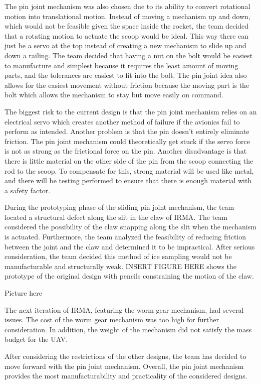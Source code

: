 		The pin joint mechanism was also chosen due to its ability to convert rotational motion into translational motion. Instead of moving a mechanism up and down, which would not be feasible given the space inside the rocket, the team decided that a rotating motion to actuate the scoop would be ideal. This way there can just be a servo at the top instead of creating a new mechanism to slide up and down a railing. The team decided that having a nut on the bolt would be easiest to manufacture and simplest because it requires the least amount of moving parts, and the tolerances are easiest to fit into the bolt. The pin joint idea also allows for the easiest movement without friction because the moving part is the bolt which allows the mechanism to stay but move easily on command.

		The biggest risk to the current design is that the pin joint mechanism relies on an electrical servo which creates another method of failure if the avionics fail to perform as intended. Another problem is that the pin doesn’t entirely eliminate friction. The pin joint mechanism could theoretically get stuck if the servo force is not as strong as the frictional force on the pin. Another disadvantage is that there is little material on the other side of the pin from the scoop connecting the rod to the scoop. To compensate for this, strong material will be used like metal, and there will be testing performed to ensure that there is enough material with a safety factor.

		During the prototyping phase of the sliding pin joint mechanism, the team located a structural defect along the slit in the claw of IRMA. The team considered the possibility of the claw snapping along the slit when the mechanism is actuated. Furthermore, the team analyzed the feasibility of reducing friction between the joint and the claw and determined it to be impractical. After serious consideration, the team decided this method of ice sampling would not be manufacturable and structurally weak. INSERT FIGURE HERE shows the prototype of the original design with pencils constraining the motion of the claw. 

		Picture here

		The next iteration of IRMA, featuring the worm gear mechanism, had several issues. The cost of the worm gear mechanism was too high for further consideration. In addition, the weight of the mechanism did not satisfy the mass budget for the UAV. 

		After considering the restrictions of the other designs, the team has decided to move forward with the pin joint mechanism. Overall, the pin joint mechanism provides the most manufacturability and practicality of the considered designs. 


